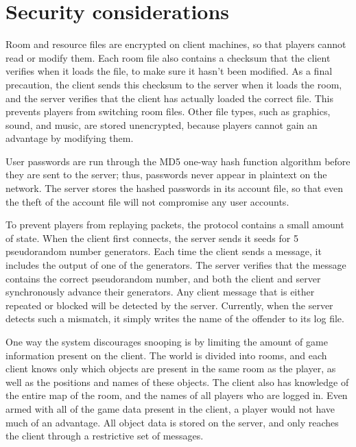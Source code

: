 \section{Security considerations}

Room and resource files are encrypted on client machines, so that
players cannot read or modify them.  Each room file also contains a
checksum that the client verifies when it loads the file, to make sure
it hasn't been modified.  As a final precaution, the client sends this
checksum to the server when it loads the room, and the server verifies
that the client has actually loaded the correct file.  This prevents
players from switching room files.  Other file types, such as
graphics, sound, and music, are stored unencrypted, because players
cannot gain an advantage by modifying them.

User passwords are run through the MD5 one-way hash function algorithm
before they are sent to the server; thus, passwords never appear in
plaintext on the network.  The server stores the hashed passwords in
its account file, so that even the theft of the account file will not
compromise any user accounts.

To prevent players from replaying packets, the protocol contains a
small amount of state.  When the client first connects, the server
sends it seeds for 5 pseudorandom number generators.  Each time the
client sends a message, it includes the output of one of the
generators.  The server verifies that the message contains the correct
pseudorandom number, and both the client and server synchronously
advance their generators.  Any client message that is either repeated
or blocked will be detected by the server.  Currently, when the server
detects such a mismatch, it simply writes the name of the offender to
its log file.

One way the system discourages snooping is by limiting the amount of
game information present on the client.  The world is divided into
rooms, and each client knows only which objects are present in the
same room as the player, as well as the positions and names of these
objects.  The client also has knowledge of the entire map of the room,
and the names of all players who are logged in.  Even armed with all of the
game data present in the client, a player would not have much of an
advantage.  All object data is stored on the server, and only reaches
the client through a restrictive set of messages.

